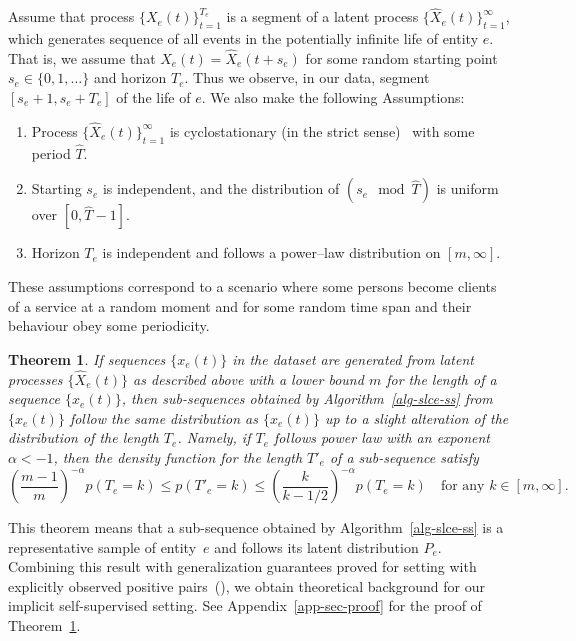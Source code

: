 \documentclass{article}
\newtheorem{thm}{Theorem}
\begin{document}
Assume that process $\{X_e(t)\}_{t=1}^{T_e}$ is a segment of a latent process $\{\widehat{X}_e(t)\}_{t=1}^{\infty}$, which generates sequence of all events in the potentially infinite life of entity $e$. That is, we assume that $X_e(t)=\widehat{X}_e(t+s_e)$ for some random starting point $s_e\in \{0,1,\ldots\}$ and horizon $T_e$. Thus we observe, in our data, segment $[s_e+1,s_e+T_e]$ of the life of $e$. We also make the following Assumptions:
\begin{enumerate}
    \item Process $\{\widehat{X}_e(t)\}_{t=1}^{\infty}$ is cyclostationary (in the strict sense)~\citep{Gardner2006Cyclostationarity} with some period $\widehat{T}$.
    \item Starting $s_e$ is independent, and the distribution of $(s_e \mod \widehat{T})$ is uniform over $[0,\widehat{T}-1]$.
    \item Horizon $T_e$ is independent and follows a power--law distribution on $[m,\infty]$.
\end{enumerate}
These assumptions correspond to a scenario where some persons become clients of a service at a random moment and for some random time span and their behaviour obey some periodicity.    %
\begin{thm}\label{thm:distribution}
If sequences $\{x_e(t)\}$ in the dataset are generated from latent processes $\{\widehat{X}_e(t)\}$ as described above with a lower bound $m$ for the length of a sequence $\{x_e(t)\}$, then sub-sequences obtained by Algorithm~\ref{alg-slce-ss} from $\{x_e(t)\}$ follow the same distribution as $\{x_e(t)\}$ up to a slight alteration of the distribution of the length $T_e$. Namely, if $T_e$ follows power law with an exponent $\alpha <-1$, then the density function for the length $T'_e$ of a sub-sequence satisfy 
\begin{equation}\label{probability_ratio}
    \left (\frac{m-1}{m}\right )^{-\alpha} p(T_e=k)\leq p(T'_e=k) \leq \left(\frac{k}{k-1/2}\right )^{-\alpha} p(T_e=k)  \quad \mbox{for any } k\in [m,\infty].
\end{equation}
\end{thm}
This theorem means that a sub-sequence obtained by Algorithm~\ref{alg-slce-ss} is a representative sample of entity~$e$ and follows its latent distribution $P_e$. Combining this result with generalization guarantees proved for setting with explicitly observed positive pairs~(\cite{Saunshi2019ICML}), we obtain theoretical background for our implicit self-supervised setting.   
See Appendix~\ref{app-sec-proof} for the proof of Theorem~\ref{thm:distribution}.
\end{document}
